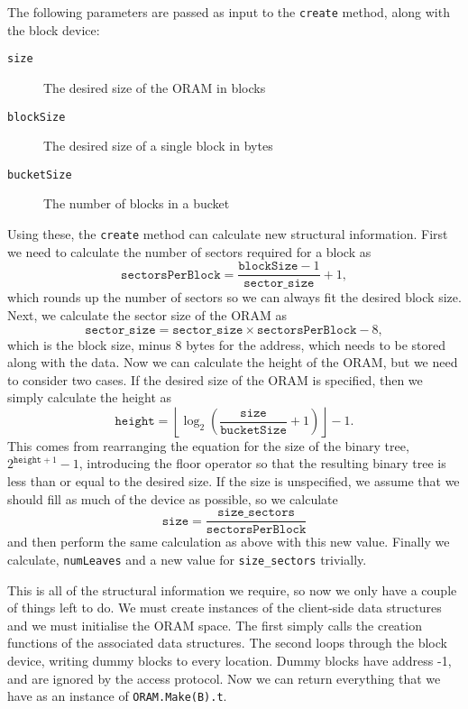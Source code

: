 \documentclass[12pt,a4paper,twoside,openright]{report}
\begin{document}
The following parameters are passed as input to the \texttt{create} method, along with the block device:

\begin{description}
  \item[\texttt{size}] The desired size of the ORAM in blocks
  \item[\texttt{blockSize}] The desired size of a single block in bytes
  \item[\texttt{bucketSize}] The number of blocks in a bucket
\end{description}

Using these, the \texttt{create} method can calculate new structural information. First we need to calculate the number of sectors required for a block as $$\mathtt{sectorsPerBlock} = \frac{\mathtt{blockSize} - 1}{\mathtt{sector\_size}} + 1,$$ which rounds up the number of sectors so we can always fit the desired block size. Next, we calculate the sector size of the ORAM as $$\mathtt{sector\_size} = \mathtt{sector\_size} \times \mathtt{sectorsPerBlock} - 8,$$ which is the block size, minus 8 bytes for the address, which needs to be stored along with the data. Now we can calculate the height of the ORAM, but we need to consider two cases. If the desired size of the ORAM is specified, then we simply calculate the height as $$\mathtt{height} = \left\lfloor \log_2\left(\frac{\mathtt{size}}{\mathtt{bucketSize}} + 1\right)\right\rfloor - 1.$$ This comes from rearranging the equation for the size of the binary tree, $2^{\mathtt{height} + 1} - 1$, introducing the floor operator so that the resulting binary tree is less than or equal to the desired size. If the size is unspecified, we assume that we should fill as much of the device as possible, so we calculate $$\mathtt{size} = \frac{\mathtt{size\_sectors}}{\mathtt{sectorsPerBlock}}$$ and then perform the same calculation as above with this new value. Finally we calculate, \texttt{numLeaves} and a new value for \texttt{size\_sectors} trivially.

This is all of the structural information we require, so now we only have a couple of things left to do. We must create instances of the client-side data structures and we must initialise the ORAM space. The first simply calls the creation functions of the associated data structures. The second loops through the block device, writing dummy blocks to every location. Dummy blocks have address -1, and are ignored by the access protocol. Now we can return everything that we have as an instance of \texttt{ORAM.Make(B).t}.
\end{document}
